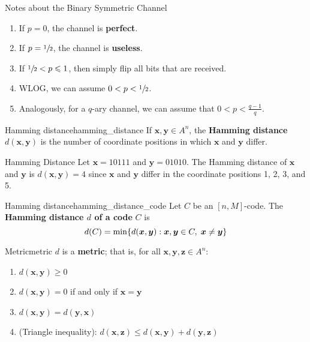 \begin{Definition}{Notes about the Binary Symmetric Channel}{}
    \begin{enumerate}[label=(\Roman*)]
        \item If $ p=0 $, the channel is \textbf{perfect}.
        \item If $ p=\sfrac{1}{2} $, the channel is \textbf{useless}.
        \item If $ \sfrac{1}{2}<p\leqslant 1 $, then simply flip all bits that are received.
        \item WLOG, we can assume $ 0<p<\sfrac{1}{2} $.
        \item Analogously, for a $ q $-ary channel, we can assume that $ 0<p<\frac{q-1}{q} $.
    \end{enumerate}
\end{Definition}

\begin{Definition}{Hamming distance}{hamming_distance}
    If $ \bm{x},\bm{y}\in A^n $, the \textbf{Hamming distance} $ d(\bm{x},\bm{y}) $ is
    the number of coordinate positions in which $ \bm{x} $ and $ \bm{y} $ differ.
\end{Definition}

\begin{Example}{Hamming Distance}{}
    Let $ \bm{x} = 10111 $ and $ \bm{y} = 01010 $. The Hamming distance
    of $ \bm{x} $ and $ \bm{y} $ is $  d(\bm{x},\bm{y})=4  $
    since $ \bm{x} $ and $ \bm{y} $ differ in the coordinate positions
    1, 2, 3, and 5.
\end{Example}

\begin{Definition}{Hamming distance}{hamming_distance_code}
    Let $ C $ be an $ [n,M] $-code.
    The \textbf{Hamming distance $ d $ of a code} $ C $ is
    \[ d(C)=\min \{d(\bm{x},\bm{y}):\bm{x},\bm{y}\in C,\;\bm{x}\neq \bm{y}\} \]
\end{Definition}

\begin{Theorem}{Metric}{metric}
    $ d $ is a \textbf{metric}; that is, for all $ \bm{x},\bm{y},\bm{z}\in A^n $:
    \begin{enumerate}[label=(\arabic*)]
        \item\label{thm:metric:1} $ d(\bm{x},\bm{y})\geqslant 0 $
        \item\label{thm:metric:2} $ d(\bm{x},\bm{y})=0 $ if and only if
              $ \bm{x}=\bm{y} $
        \item\label{thm:metric:3} $ d(\bm{x},\bm{y})=d(\bm{y},\bm{x}) $
        \item\label{thm:metric:4} (Triangle inequality): $ d(\bm{x},\bm{z})\leqslant
                  d(\bm{x},\bm{y})+d(\bm{y},\bm{z}) $
    \end{enumerate}
\end{Theorem}

